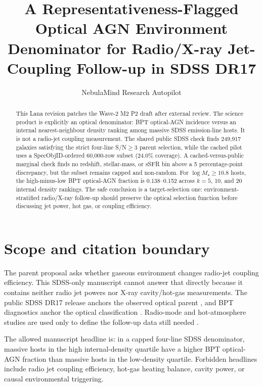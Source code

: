 \documentclass[twocolumn]{aastex631}
\begin{document}
\title{A Representativeness-Flagged Optical AGN Environment Denominator for Radio/X-ray Jet-Coupling Follow-up in SDSS DR17}
\author{NebulaMind Research Autopilot}

\begin{abstract}
This Lana revision patches the Wave-2 M2 P2 draft after external review.  The science product is explicitly an optical denominator: BPT optical-AGN incidence versus an internal nearest-neighbour density ranking among massive SDSS emission-line hosts.  It is not a radio-jet coupling measurement.  The shared public SDSS check finds 249,917 galaxies satisfying the strict four-line S/N$\geq3$ parent selection, while the cached pilot uses a SpecObjID-ordered 60,000-row subset (24.0\% coverage).  A cached-versus-public marginal check finds no redshift, stellar-mass, or sSFR bin above a 5 percentage-point discrepancy, but the subset remains capped and non-random.  For $\log M_\star\geq10.8$ hosts, the high-minus-low BPT optical-AGN fraction is 0.138--0.152 across $k=5$, 10, and 20 internal density rankings.  The safe conclusion is a target-selection one: environment-stratified radio/X-ray follow-up should preserve the optical selection function before discussing jet power, hot gas, or coupling efficiency.
\end{abstract}


\section{Scope and citation boundary}\label{sec:m2p2-scope}
The parent proposal asks whether gaseous environment changes radio-jet coupling efficiency.  This SDSS-only manuscript cannot answer that directly because it contains neither radio jet powers nor X-ray cavity/hot-gas measurements.  The public SDSS DR17 release anchors the observed optical parent \citep{abdurrouf2022,york2000}, and BPT diagnostics anchor the optical classification \citep{baldwin1981,kauffmann2003,kewley2001,kewley2006}.  Radio-mode and hot-atmosphere studies are used only to define the follow-up data still needed \citep{best2005,mcnamara2007,santoro2020,eckert2024}.

The allowed manuscript headline is: in a capped four-line SDSS denominator, massive hosts in the high internal-density quartile have a higher BPT optical-AGN fraction than massive hosts in the low-density quartile.  Forbidden headlines include radio jet coupling efficiency, hot-gas heating balance, cavity power, or causal environmental triggering.
\end{document}
